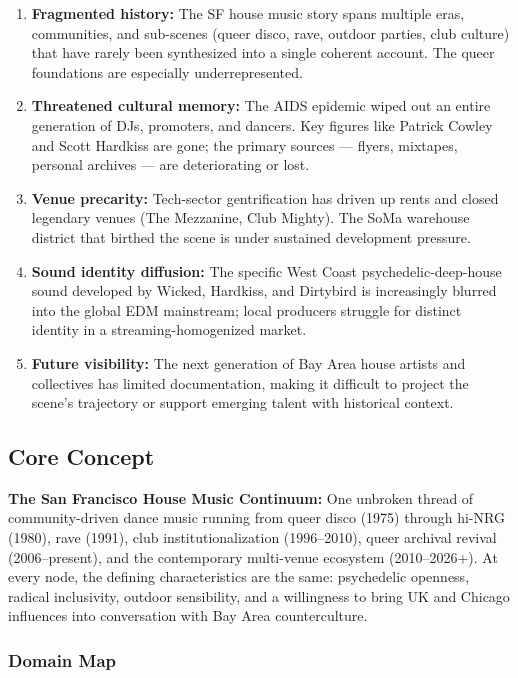 \documentclass[11pt,letterpaper]{article}
\begin{document}
\begin{enumerate}
  \item \textbf{Fragmented history:} The SF house music story spans multiple eras, communities, and sub-scenes (queer disco, rave, outdoor parties, club culture) that have rarely been synthesized into a single coherent account. The queer foundations are especially underrepresented.
  \item \textbf{Threatened cultural memory:} The AIDS epidemic wiped out an entire generation of DJs, promoters, and dancers. Key figures like Patrick Cowley and Scott Hardkiss are gone; the primary sources --- flyers, mixtapes, personal archives --- are deteriorating or lost.
  \item \textbf{Venue precarity:} Tech-sector gentrification has driven up rents and closed legendary venues (The Mezzanine, Club Mighty). The SoMa warehouse district that birthed the scene is under sustained development pressure.
  \item \textbf{Sound identity diffusion:} The specific West Coast psychedelic-deep-house sound developed by Wicked, Hardkiss, and Dirtybird is increasingly blurred into the global EDM mainstream; local producers struggle for distinct identity in a streaming-homogenized market.
  \item \textbf{Future visibility:} The next generation of Bay Area house artists and collectives has limited documentation, making it difficult to project the scene's trajectory or support emerging talent with historical context.
\end{enumerate}

\subsection{Core Concept}

\textbf{The San Francisco House Music Continuum:} One unbroken thread of community-driven dance music running from queer disco (1975) through hi-NRG (1980), rave (1991), club institutionalization (1996--2010), queer archival revival (2006--present), and the contemporary multi-venue ecosystem (2010--2026+). At every node, the defining characteristics are the same: psychedelic openness, radical inclusivity, outdoor sensibility, and a willingness to bring UK and Chicago influences into conversation with Bay Area counterculture.

\subsubsection{Domain Map}
\end{document}
